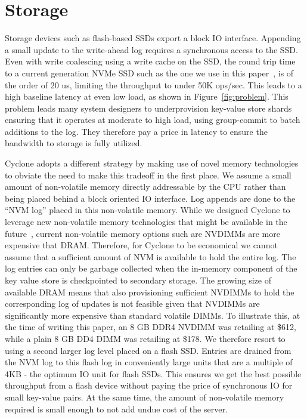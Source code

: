 \documentclass[pageno]{jpaper}
\begin{document}
\section{Storage}
\label{sec:storage}
Storage devices such as flash-based SSDs export a block IO interface. Appending
a small update to the write-ahead log requires a synchronous access to the
SSD. Even with write coalescing using a write cache on the SSD, the round trip
time to a current generation NVMe SSD such as the one we use in this
paper~\cite{ssd_spec}, is of the order of 20 us, limiting the throughput to
under 50K ops/sec. This leads to a high baseline latency at even low load, as
shown in Figure~\ref{fig:problem}. This problem leads many system designers to
underprovision key-value store shards ensuring that it operates at moderate to
high load, using group-commit to batch additions to the log. They therefore pay
a price in latency to ensure the bandwidth to storage is fully utilized.

Cyclone adopts a different strategy by making use of novel memory technologies
to obviate the need to make this tradeoff in the first place. We assume a small
amount of non-volatile memory directly addressable by the CPU rather than being
placed behind a block oriented IO interface. Log appends are done to the ``NVM
log'' placed in this non-volatile memory. While we designed Cyclone to leverage
new non-volatile memory technologies that might be available in the
future~\cite{3dxpoint}, current non-volatile memory options such are NVDIMMs are
more expensive that DRAM. Therefore, for Cyclone to be economical we cannot
assume that a sufficient amount of NVM is available to hold the entire log. The
log entries can only be garbage collected when the in-memory component of the
key value store is checkpointed to secondary storage. The growing size of
available DRAM means that also provisioning sufficient NVDIMMs to hold the
corresponding log of updates is not feasible given that NVDIMMs are
significantly more expensive than standard volatile DIMMs.  To illustrate this,
at the time of writing this paper, an 8 GB DDR4 NVDIMM was retailing at \$612,
while a plain 8 GB DD4 DIMM was retailing at \$178.  We therefore resort to
using a second larger log level placed on a flash SSD. Entries are drained from
the NVM log to this flash log in conveniently large units that are a multiple of
4KB - the optimum IO unit for flash SSDs. This ensures we get the best possible
throughput from a flash device without paying the price of synchronous IO for
small key-value pairs. At the same time, the amount of non-volatile memory
required is small enough to not add undue cost of the server.
\end{document}
